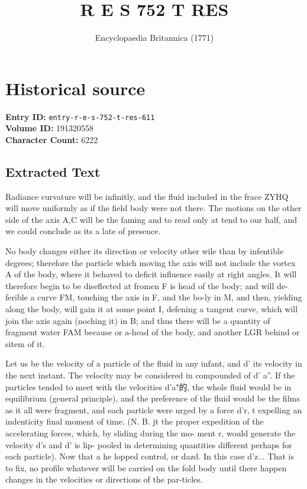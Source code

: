 \documentclass{article}
\title{R E S 752 T RES}
\date{Encyclopaedia Britannica (1771)}
\begin{document}
\maketitle

\section*{Historical source}
\textbf{Entry ID:} \texttt{entry-r-e-s-752-t-res-611} \\
\textbf{Volume ID:} 191320558 \\
\textbf{Character Count:} 6222

\subsection*{Extracted Text}
Radiance curvature will be infinitly, and the fluid included in the frace ZYHQ will move uniformly as if the field body were not there. The motions on the other side of the axis A,C will be the faming and to read only at tend to our half, and we could conclude as its a late of presence.

No body changes either its direction or velocity other wile than by infentible degrees; therefore the particle which moving the axis will not include the vortex A of the body, where it behaved to deficit influence easily at right angles. It will therefore begin to be diseflected at fromen F is head of the body; and will de-ferible a curve FM, touching the axis in F, and the bo-ly in M, and then, yielding along the body, will gain it at some point I, defening a tangent curve, which will join the axis again (noching it) in B; and thus there will be a quantity of fragment water FAM because or a-head of the body, and another LGR behind or sitem of it.

Let us be the velocity of a particle of the fluid in any infant, and d’ its velocity in the next instant. The velocity may be considered in compounded of d’ a”. If the particles tended to meet with the velocities d’a"的, the whole fluid would be in equilibrium (general principle), and the preference of the fluid would be the films as it all were fragment, and each particle were urged by a force d’r, t expelling an indenticity final moment of time. (N. B. jt the proper expedition of the accelerating forces, which, by sliding during the mo- ment r, would generate the velocity d’s and d’ is lip- pooled in determining quantities different perhaps for each particle). Now that a he lopped control, or dazd. In this case d’z... That is to fix, no profile whatever will be carried on the fold body until there happen changes in the velocities or directions of the par-ticles.
\end{document}
